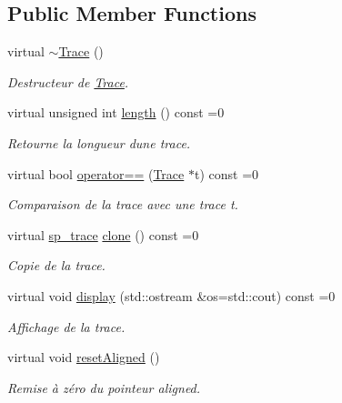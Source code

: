 \subsection*{Public Member Functions}
\begin{DoxyCompactItemize}
\item 
virtual \hyperlink{class_trace_a293f9c9de28b53b0d5edae908b90be03}{$\sim$\+Trace} ()
\begin{DoxyCompactList}\small\item\em Destructeur de \hyperlink{class_trace}{Trace}. \end{DoxyCompactList}\item 
virtual unsigned int \hyperlink{class_trace_a74a29f7e259781424d9f81409ed34701}{length} () const  =0
\begin{DoxyCompactList}\small\item\em Retourne la longueur d\textquotesingle{}une trace. \end{DoxyCompactList}\item 
virtual bool \hyperlink{class_trace_a8201809c2fcc1d02cfa8bf894a79bb5e}{operator==} (\hyperlink{class_trace}{Trace} $\ast$t) const  =0
\begin{DoxyCompactList}\small\item\em Comparaison de la trace avec une trace {\ttfamily t}. \end{DoxyCompactList}\item 
virtual \hyperlink{class_trace_a9c58e523529fc8a03fb6acf3eef86150}{sp\+\_\+trace} \hyperlink{class_trace_a0917758337e37f936713ccaf75b532f2}{clone} () const  =0
\begin{DoxyCompactList}\small\item\em Copie de la trace. \end{DoxyCompactList}\item 
virtual void \hyperlink{class_trace_a4324fa45af235238ddedc2215c3d1cf0}{display} (std\+::ostream \&os=std\+::cout) const  =0
\begin{DoxyCompactList}\small\item\em Affichage de la trace. \end{DoxyCompactList}\item 
virtual void \hyperlink{class_trace_ab152bd0c953d48da2eecda17a1762b18}{reset\+Aligned} ()
\begin{DoxyCompactList}\small\item\em Remise à zéro du pointeur {\ttfamily aligned}. \end{DoxyCompactList}\item 

\end{DoxyCompactItemize}
